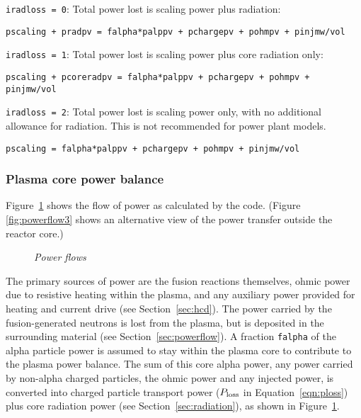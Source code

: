 \documentclass[11pt,a4paper]{report}
\begin{document}
\begin{description}

\item{\texttt{iradloss = 0}:}  Total power lost is scaling power plus
  radiation:
\begin{verbatim}
pscaling + pradpv = falpha*palppv + pchargepv + pohmpv + pinjmw/vol
\end{verbatim}

\item{\texttt{iradloss = 1}:}  Total power lost is scaling power plus core
  radiation only:
\begin{verbatim}
pscaling + pcoreradpv = falpha*palppv + pchargepv + pohmpv + pinjmw/vol
\end{verbatim}

\item{\texttt{iradloss = 2}:}  Total power lost is scaling power only, with no
  additional allowance for radiation. This is not recommended for power plant
  models.
\begin{verbatim}
pscaling = falpha*palppv + pchargepv + pohmpv + pinjmw/vol
\end{verbatim}

\end{description}

\subsubsection{Plasma core power balance}
\label{sec:corepower}

Figure~\ref{fig:powerflow1} shows the flow of power as calculated by the code. (Figure~
\ref{fig:powerflow3} shows an alternative view of the power transfer outside the reactor core.)

\begin{figure}[tbph]
\caption[Power balance within the core plasma] {\label{fig:powerflow1}
  \textit{Power flows} }
\end{figure}

The primary sources of power are the fusion reactions themselves, ohmic power
due to resistive heating within the plasma, and any auxiliary power provided
for heating and current drive (see Section~\ref{sec:hcd}). The power carried
by the fusion-generated neutrons is lost from the plasma, but is deposited in
the surrounding material (see Section~\ref{sec:powerflow}). A fraction
\texttt{falpha} of the alpha particle power is assumed to stay within the
plasma core to contribute to the plasma power balance. The sum of this core
alpha power, any power carried by non-alpha charged particles, the ohmic power
and any injected power, is converted into charged particle transport power
($P_{\mbox{\scriptsize loss}}$ in Equation~\ref{eqn:ploss}) plus core
radiation power (see Section~\ref{sec:radiation}), as shown in
Figure~\ref{fig:powerflow1}. 
\end{document}
